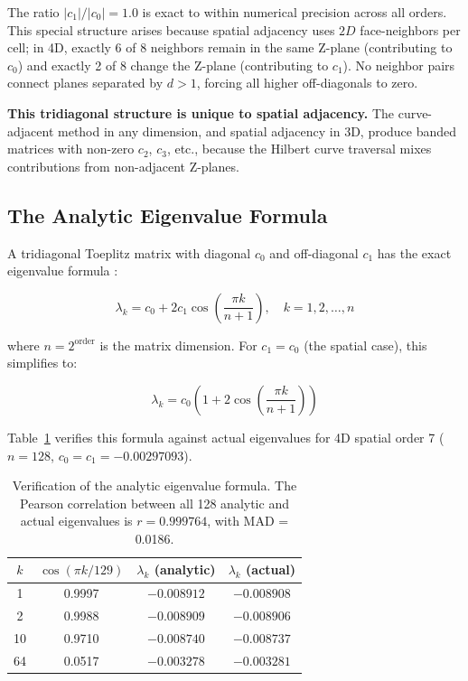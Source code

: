 \documentclass[11pt,a4paper]{article}
\begin{document}
The ratio $|c_1|/|c_0| = 1.0$ is exact to within numerical precision across
all orders. This special structure arises because spatial adjacency uses
$2D$ face-neighbors per cell; in 4D, exactly 6 of 8 neighbors remain in the
same Z-plane (contributing to $c_0$) and exactly 2 of 8 change the Z-plane
(contributing to $c_1$). No neighbor pairs connect planes separated by $d >
1$, forcing all higher off-diagonals to zero.

\textbf{This tridiagonal structure is unique to spatial adjacency.} The
curve-adjacent method in any dimension, and spatial adjacency in 3D, produce
banded matrices with non-zero $c_2$, $c_3$, etc., because the Hilbert curve
traversal mixes contributions from non-adjacent Z-planes.

\subsection{The Analytic Eigenvalue Formula}
\label{sec:analytic-formula}

A tridiagonal Toeplitz matrix with diagonal $c_0$ and off-diagonal $c_1$
has the exact eigenvalue formula \cite{grenander1958}:

\begin{equation}
\lambda_k = c_0 + 2c_1 \cos\left(\frac{\pi k}{n+1}\right), \quad k = 1, 2, \ldots, n
\label{eq:cosine-eigenvalues}
\end{equation}

where $n = 2^{\text{order}}$ is the matrix dimension. For $c_1 = c_0$ (the
spatial case), this simplifies to:

\begin{equation}
\lambda_k = c_0\left(1 + 2\cos\left(\frac{\pi k}{n+1}\right)\right)
\label{eq:special-cosine}
\end{equation}

Table~\ref{tab:analytic-verify} verifies this formula against actual
eigenvalues for 4D spatial order 7 ($n=128$, $c_0 = c_1 = -0.00297093$).

\begin{table}[h]
\centering
\begin{tabular}{cccc}
\toprule
$k$ & $\cos(\pi k/129)$ & $\lambda_k$ (analytic) & $\lambda_k$ (actual) \\
\midrule
1  & 0.9997 & $-0.008912$ & $-0.008908$ \\
2  & 0.9988 & $-0.008909$ & $-0.008906$ \\
10 & 0.9710 & $-0.008740$ & $-0.008737$ \\
64 & 0.0517 & $-0.003278$ & $-0.003281$ \\
\bottomrule
\end{tabular}
\caption{Verification of the analytic eigenvalue formula. The Pearson
correlation between all 128 analytic and actual eigenvalues is $r =
0.999764$, with MAD = 0.0186.}
\label{tab:analytic-verify}
\end{table}
\end{document}
